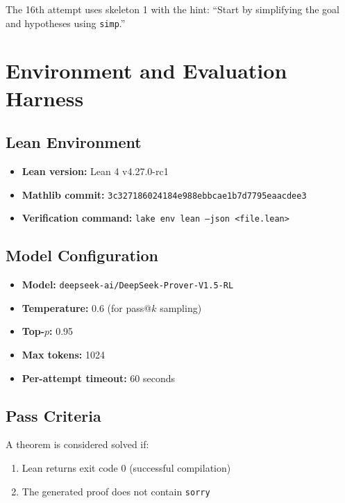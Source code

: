 \documentclass{article}
\begin{document}
\noindent The 16th attempt uses skeleton 1 with the hint: ``Start by simplifying the goal and hypotheses using \texttt{simp}.''

\section{Environment and Evaluation Harness}
\label{app:env}

\subsection{Lean Environment}
\begin{itemize}
\item \textbf{Lean version:} Lean 4 v4.27.0-rc1
\item \textbf{Mathlib commit:} \texttt{3c327186024184e988ebbcae1b7d7795eaacdee3}
\item \textbf{Verification command:} \texttt{lake env lean --json <file.lean>}
\end{itemize}

\subsection{Model Configuration}
\begin{itemize}
\item \textbf{Model:} \texttt{deepseek-ai/DeepSeek-Prover-V1.5-RL}
\item \textbf{Temperature:} 0.6 (for pass@$k$ sampling)
\item \textbf{Top-$p$:} 0.95
\item \textbf{Max tokens:} 1024
\item \textbf{Per-attempt timeout:} 60 seconds
\end{itemize}

\subsection{Pass Criteria}
A theorem is considered solved if:
\begin{enumerate}
\item Lean returns exit code 0 (successful compilation)
\item The generated proof does not contain \texttt{sorry}
\end{enumerate}



\end{document}
